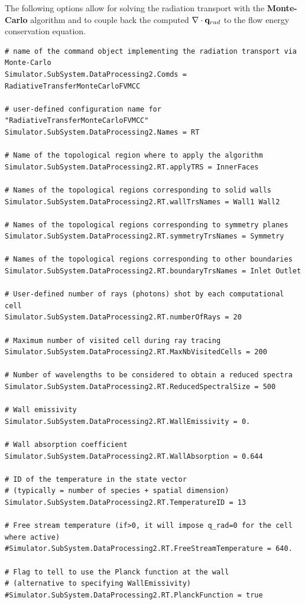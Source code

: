 \documentclass[11pt]{article}
\begin{document}
The following options allow for solving the radiation transport with the \textbf{Monte-Carlo} algorithm 
and to couple back the computed $\nabla \cdot {\bf q}_{rad}$ to the flow energy conservation equation. 

\begin{lstlisting}[breaklines]
# name of the command object implementing the radiation transport via Monte-Carlo
Simulator.SubSystem.DataProcessing2.Comds = RadiativeTransferMonteCarloFVMCC

# user-defined configuration name for "RadiativeTransferMonteCarloFVMCC"
Simulator.SubSystem.DataProcessing2.Names = RT

# Name of the topological region where to apply the algorithm
Simulator.SubSystem.DataProcessing2.RT.applyTRS = InnerFaces

# Names of the topological regions corresponding to solid walls
Simulator.SubSystem.DataProcessing2.RT.wallTrsNames = Wall1 Wall2

# Names of the topological regions corresponding to symmetry planes
Simulator.SubSystem.DataProcessing2.RT.symmetryTrsNames = Symmetry

# Names of the topological regions corresponding to other boundaries
Simulator.SubSystem.DataProcessing2.RT.boundaryTrsNames = Inlet Outlet

# User-defined number of rays (photons) shot by each computational cell 
Simulator.SubSystem.DataProcessing2.RT.numberOfRays = 20

# Maximum number of visited cell during ray tracing
Simulator.SubSystem.DataProcessing2.RT.MaxNbVisitedCells = 200

# Number of wavelengths to be considered to obtain a reduced spectra 
Simulator.SubSystem.DataProcessing2.RT.ReducedSpectralSize = 500

# Wall emissivity 
Simulator.SubSystem.DataProcessing2.RT.WallEmissivity = 0.

# Wall absorption coefficient 
Simulator.SubSystem.DataProcessing2.RT.WallAbsorption = 0.644

# ID of the temperature in the state vector 
# (typically = number of species + spatial dimension)
Simulator.SubSystem.DataProcessing2.RT.TemperatureID = 13

# Free stream temperature (if>0, it will impose q_rad=0 for the cell where active)
#Simulator.SubSystem.DataProcessing2.RT.FreeStreamTemperature = 640.

# Flag to tell to use the Planck function at the wall 
# (alternative to specifying WallEmissivity)
#Simulator.SubSystem.DataProcessing2.RT.PlanckFunction = true
\end{lstlisting}
\end{document}
